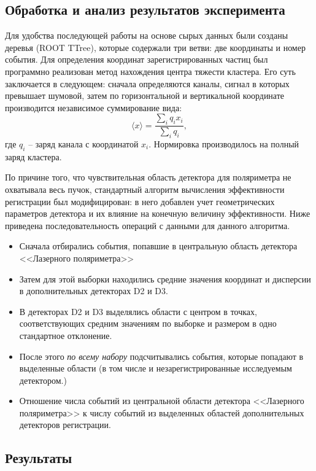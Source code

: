 \subsection{Обработка и анализ результатов эксперимента}
Для удобства последующей работы на основе сырых данных были созданы деревья (ROOT TTree), которые содержали три ветви: две координаты и номер события. Для определения координат зарегистрированных частиц был программно реализован метод нахождения центра тяжести кластера. Его суть заключается в следующем: сначала определяются каналы, сигнал в которых превышает шумовой, затем по горизонтальной и вертикальной координате производится независимое суммирование вида: 
\begin{equation}
 \langle x \rangle = \frac{\sum_{i}q_i x_i}{\sum_{i}q_i},
\end{equation}
где $q_i$ -- заряд канала с координатой $x_i$. Нормировка производилось на полный заряд кластера.
\par По причине того, что чувствительная область детектора для поляриметра не охватывала весь пучок, стандартный алгоритм вычисления эффективности регистрации был модифицирован: в него добавлен учет геометрических параметров детектора и их влияние на конечную величину эффективности. Ниже приведена последовательность операций с данными для данного алгоритма.
\begin{itemize}
	\item Сначала отбирались события, попавшие в центральную область детектора <<Лазерного поляриметра>>
	\item Затем для этой выборки находились средние значения координат и дисперсии в дополнительных детекторах D2 и D3. 
	\item В детекторах D2 и D3 выделялись области с центром в точках, соответствующих средним значениям по выборке и размером в одно стандартное отклонение. 
	\item После этого \textit {по всему набору} подсчитывались события, которые попадают в выделенные области (в том числе и незарегистрированные исследуемым детектором.)
	\item Отношение числа событий из центральной области детектора <<Лазерного поляриметра>> к числу событий из выделенных областей дополнительных детекторов  регистрации. 
\end{itemize}

\subsection{Результаты}


